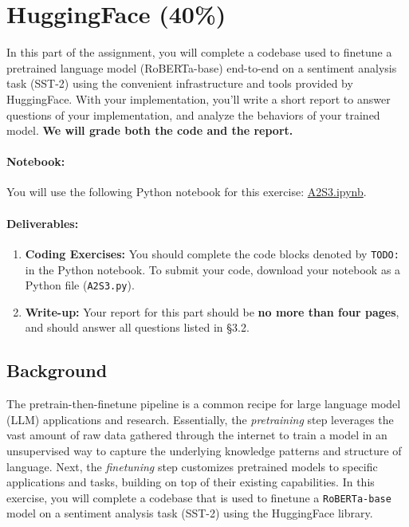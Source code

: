 \documentclass{article}
\newcommand{\sst}{SST-2\xspace}
\newcommand{\modelthree}{RoBERTa-base\xspace}
\begin{document}
\newpage

\section{HuggingFace (40\%)}

In this part of the assignment, you will complete a codebase used to finetune a
pretrained language model (\modelthree) end-to-end on a sentiment analysis task
(\sst) using the convenient infrastructure and tools provided by HuggingFace.
With your implementation, you'll write a short report to answer questions of
your implementation, and analyze the behaviors of your trained model. \textbf{We
will grade both the code and the report.}

\paragraph{Notebook:}
You will use the following Python notebook for this exercise:
\textcolor{blue}{\href{https://colab.research.google.com/drive/13oBf6_e6xc9W9uJIxjndX1z-SwPRysRw?usp=sharing}{A2S3.ipynb}}.

\paragraph{Deliverables:} 

\begin{enumerate}
\item \textbf{Coding Exercises:} You should complete the code blocks denoted by
\texttt{TODO:} in the Python notebook. To submit your code, download your
notebook as a Python file (\verb|A2S3.py|).
\item \textbf{Write-up:} Your report for this part should be \textbf{no more
than four pages}, and should answer all questions listed in \S 3.2. 
\end{enumerate}

\subsection{Background}

The pretrain-then-finetune pipeline is a common recipe for large language model
(LLM) applications and research. Essentially, the \textit{pretraining} step
leverages the vast amount of raw data gathered through the internet to train a
model in an unsupervised way to capture the underlying knowledge patterns and
structure of language. Next, the \textit{finetuning} step customizes pretrained
models to specific applications and tasks, building on top of their existing
capabilities. In this exercise, you will complete a codebase that is used to
finetune a \texttt{\modelthree} model on a sentiment analysis task (\sst) using
the HuggingFace library. 
\end{document}
